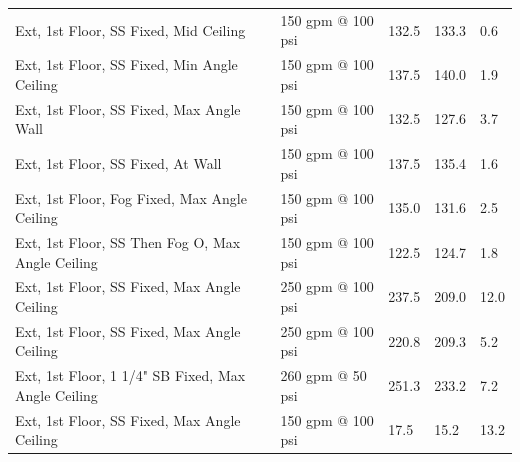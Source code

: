 \documentclass{book}
\begin{document}
\begin{table}[]
\begin{tabular}{lllll}
Ext, 1st Floor, SS Fixed, Mid Ceiling                 & 150 gpm @ 100 psi                   & 132.5                                  & 133.3                                   & 0.6                                     \\
Ext, 1st Floor, SS Fixed, Min Angle Ceiling           & 150 gpm @ 100 psi                   & 137.5                                  & 140.0                                   & 1.9                                     \\
Ext, 1st Floor, SS Fixed, Max Angle Wall              & 150 gpm @ 100 psi                   & 132.5                                  & 127.6                                   & 3.7                                     \\
Ext, 1st Floor, SS Fixed, At Wall                     & 150 gpm @ 100 psi                   & 137.5                                  & 135.4                                   & 1.6                                     \\
Ext, 1st Floor, Fog Fixed, Max Angle Ceiling          & 150 gpm @ 100 psi                   & 135.0                                  & 131.6                                   & 2.5                                     \\
Ext, 1st Floor, SS Then Fog O, Max Angle Ceiling      & 150 gpm @ 100 psi                   & 122.5                                  & 124.7                                   & 1.8                                     \\
Ext, 1st Floor, SS Fixed, Max Angle Ceiling           & 250 gpm @ 100 psi                   & 237.5                                  & 209.0                                   & 12.0                                    \\
Ext, 1st Floor, SS Fixed, Max Angle Ceiling           & 250 gpm @ 100 psi                   & 220.8                                  & 209.3                                   & 5.2                                     \\
Ext, 1st Floor, 1 1/4" SB Fixed, Max Angle Ceiling    & 260 gpm @ 50 psi                    & 251.3                                  & 233.2                                   & 7.2                                     \\
Ext, 1st Floor, SS Fixed, Max Angle Ceiling           & 150 gpm @ 100 psi                   & 17.5                                   & 15.2                                    & 13.2                                    \\

\end{tabular}
\end{table}
\end{document}
